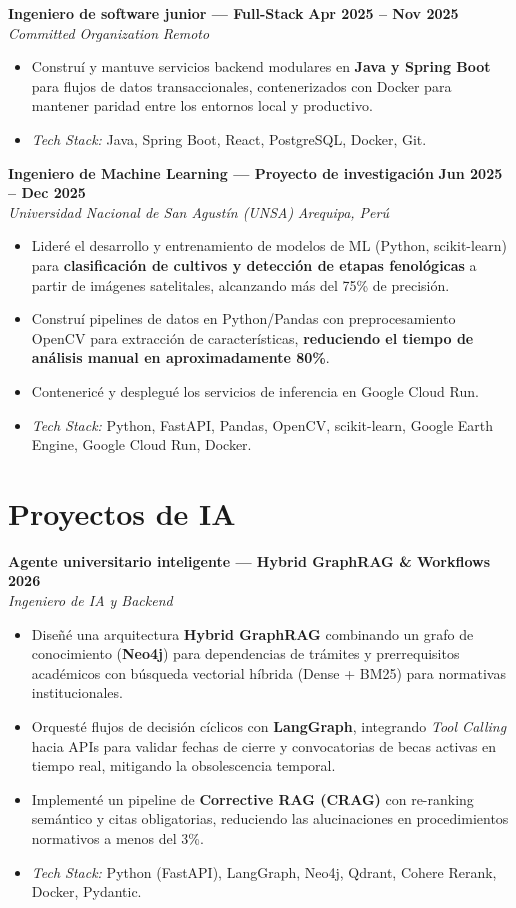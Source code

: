 \documentclass[11pt,letterpaper]{article}
\newcommand{\cventry}[4]{%
  \textbf{#1} \hfill \textbf{#2}\\
  \textit{#3} \hfill \textit{#4}\par\nobreak\vspace{1pt}%
}
\begin{document}
\cventry{Ingeniero de software junior --- Full-Stack}{Apr 2025 -- Nov 2025}{Committed Organization}{Remoto}
\begin{itemize}
  \item Construí y mantuve servicios backend modulares en \textbf{Java y Spring Boot} para flujos de datos transaccionales, contenerizados con Docker para mantener paridad entre los entornos local y productivo.
  \item \textit{Tech Stack:} Java, Spring Boot, React, PostgreSQL, Docker, Git.
\end{itemize}

\cventry{Ingeniero de Machine Learning --- Proyecto de investigación}{Jun 2025 -- Dec 2025}{Universidad Nacional de San Agustín (UNSA)}{Arequipa, Perú}
\begin{itemize}
  \item Lideré el desarrollo y entrenamiento de modelos de ML (Python, scikit-learn) para \textbf{clasificación de cultivos y detección de etapas fenológicas} a partir de imágenes satelitales, alcanzando más del 75\% de precisión.
  \item Construí pipelines de datos en Python/Pandas con preprocesamiento OpenCV para extracción de características, \textbf{reduciendo el tiempo de análisis manual en aproximadamente 80\%}.
  \item Contenericé y desplegué los servicios de inferencia en Google Cloud Run.
  \item \textit{Tech Stack:} Python, FastAPI, Pandas, OpenCV, scikit-learn, Google Earth Engine, Google Cloud Run, Docker.
\end{itemize}

\section{Proyectos de IA}

\cventry{Agente universitario inteligente --- Hybrid GraphRAG \& Workflows}{2026}{Ingeniero de IA y Backend}{}
\begin{itemize}
  \item Diseñé una arquitectura \textbf{Hybrid GraphRAG} combinando un grafo de conocimiento (\textbf{Neo4j}) para dependencias de trámites y prerrequisitos académicos con búsqueda vectorial híbrida (Dense + BM25) para normativas institucionales.
  \item Orquesté flujos de decisión cíclicos con \textbf{LangGraph}, integrando \textit{Tool Calling} hacia APIs para validar fechas de cierre y convocatorias de becas activas en tiempo real, mitigando la obsolescencia temporal.
  \item Implementé un pipeline de \textbf{Corrective RAG (CRAG)} con re-ranking semántico y citas obligatorias, reduciendo las alucinaciones en procedimientos normativos a menos del 3\%.
  \item \textit{Tech Stack:} Python (FastAPI), LangGraph, Neo4j, Qdrant, Cohere Rerank, Docker, Pydantic.
\end{itemize}
\end{document}
